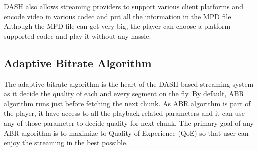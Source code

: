 DASH also allows streaming providers to support various client platforms and encode video in various codec and put all the information in the MPD file. Although the MPD file can get very big, the player can choose a platform supported codec and play it without any hassle.


\subsection{Adaptive Bitrate Algorithm}
The adaptive bitrate algorithm is the heart of the DASH based streaming system as it decide the quality of each and every segment on the fly. By default, ABR algorithm runs just before fetching the next chunk. As ABR algorithm is part of the player, it have access to all the playback related parameters and it can use any of those parameter to decide quality for next chunk. The primary goal of any ABR algorithm is to maximize to Quality of Experience (QoE) so that user can enjoy the streaming in the best possible.

